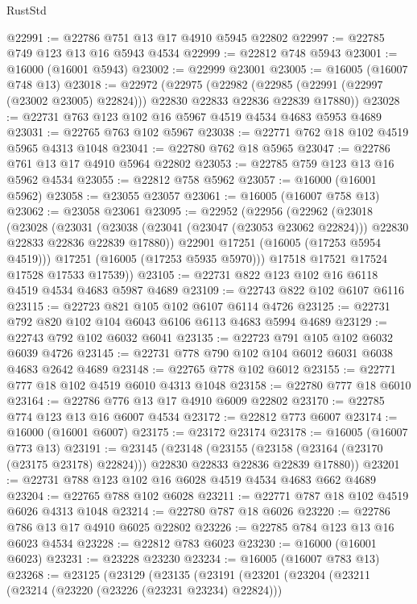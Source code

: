 \begin{lexlean}{RustStd}
\begin{coremodule}
@22991 := @22786 @751 @13 @17 @4910 @5945 @22802
@22997 := @22785 @749 @123 @13 @16 @5943 @4534
@22999 := @22812 @748 @5943
@23001 := @16000 (@16001 @5943)
@23002 := @22999 @23001
@23005 := @16005 (@16007 @748 @13)
@23018 := @22972
    (@22975
      (@22982 (@22985 (@22991 (@22997 (@23002 @23005) @22824))) @22830 @22833 @22836 @22839 @17880))
@23028 := @22731 @763 @123 @102 @16 @5967 @4519 @4534 @4683 @5953 @4689
@23031 := @22765 @763 @102 @5967
@23038 := @22771 @762 @18 @102 @4519 @5965 @4313 @1048
@23041 := @22780 @762 @18 @5965
@23047 := @22786 @761 @13 @17 @4910 @5964 @22802
@23053 := @22785 @759 @123 @13 @16 @5962 @4534
@23055 := @22812 @758 @5962
@23057 := @16000 (@16001 @5962)
@23058 := @23055 @23057
@23061 := @16005 (@16007 @758 @13)
@23062 := @23058 @23061
@23095 := @22952
    (@22956
      (@22962
        (@23018
          (@23028
            (@23031
              (@23038 (@23041 (@23047 (@23053 @23062 @22824))) @22830 @22833 @22836 @22839 @17880))
            @22901
            @17251
            (@16005 (@17253 @5954 @4519)))
          @17251
          (@16005 (@17253 @5935 @5970)))
        @17518
        @17521
        @17524
        @17528
        @17533
        @17539))
@23105 := @22731 @822 @123 @102 @16 @6118 @4519 @4534 @4683 @5987 @4689
@23109 := @22743 @822 @102 @6107 @6116
@23115 := @22723 @821 @105 @102 @6107 @6114 @4726
@23125 := @22731 @792 @820 @102 @104 @6043 @6106 @6113 @4683 @5994 @4689
@23129 := @22743 @792 @102 @6032 @6041
@23135 := @22723 @791 @105 @102 @6032 @6039 @4726
@23145 := @22731 @778 @790 @102 @104 @6012 @6031 @6038 @4683 @2642 @4689
@23148 := @22765 @778 @102 @6012
@23155 := @22771 @777 @18 @102 @4519 @6010 @4313 @1048
@23158 := @22780 @777 @18 @6010
@23164 := @22786 @776 @13 @17 @4910 @6009 @22802
@23170 := @22785 @774 @123 @13 @16 @6007 @4534
@23172 := @22812 @773 @6007
@23174 := @16000 (@16001 @6007)
@23175 := @23172 @23174
@23178 := @16005 (@16007 @773 @13)
@23191 := @23145
    (@23148
      (@23155 (@23158 (@23164 (@23170 (@23175 @23178) @22824))) @22830 @22833 @22836 @22839 @17880))
@23201 := @22731 @788 @123 @102 @16 @6028 @4519 @4534 @4683 @662 @4689
@23204 := @22765 @788 @102 @6028
@23211 := @22771 @787 @18 @102 @4519 @6026 @4313 @1048
@23214 := @22780 @787 @18 @6026
@23220 := @22786 @786 @13 @17 @4910 @6025 @22802
@23226 := @22785 @784 @123 @13 @16 @6023 @4534
@23228 := @22812 @783 @6023
@23230 := @16000 (@16001 @6023)
@23231 := @23228 @23230
@23234 := @16005 (@16007 @783 @13)
@23268 := @23125
    (@23129
      (@23135
        (@23191
          (@23201
            (@23204
              (@23211
                (@23214 (@23220 (@23226 (@23231 @23234) @22824)))

\end{coremodule}
\end{lexlean}
